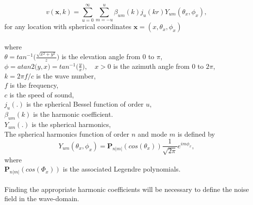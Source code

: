 \begin{equation}
    v(\mathbf{x},k)=\sum_{u=0}^\infty \sum_{m=-u}^u\beta_{um}(k)j_u(kr)Y_{um}(\theta_x,\phi_x),
    \label{eq:wave_field_decomposition}
\end{equation}
for any location with spherical coordinates $\mathbf{x}=(x,\theta_x,\phi_x)$\\\\
where\\
$\theta = tan^{-1}\bigg(\frac{\sqrt{x^2+y^2}}{z}\bigg)$ is the elevation angle from $0$ to $\pi$,\\
$\phi = atan2\bigg(y,x\bigg) = tan^{-1}\bigg(\frac{y}{x}\bigg),\quad  x >0$ is the azimuth angle from $0$ to $2\pi$,\\
$k=2\pi f/c$ is the wave number,\\
$f$ is the frequency,\\
$c$ is the speed of sound,\\
$j_u(.)$ is the spherical Bessel function of order $u$,\\
$\beta_{um}(k)$ is the harmonic coefficient.\\ 
$Y_{um}(.)$ is the spherical harmonics,\\
The spherical harmonics function of order $n$ and mode $m$ is defined by\cite{Samarasinghe2018}
\begin{equation}
    Y_{um}(\theta_x,\phi_x) = \mathbf{P}_{n|m|}(cos(\theta_x))\frac{1}{\sqrt{2\pi}}e^{im\phi_x},
\end{equation}
where\\
$\mathbf{P}_{n|m|}(cos(\Phi_x))$ is the associated Legendre polynomials.\\\\
Finding the appropriate harmonic coefficients will be necessary to define the noise field in the wave-domain.
